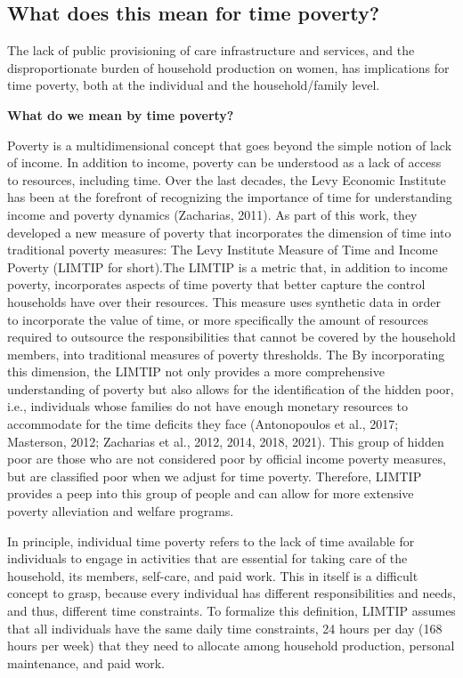 \documentclass[
  11pt,
]{article}
\begin{document}
\subsection{What does this mean for time
poverty?}\label{what-does-this-mean-for-time-poverty}

The lack of public provisioning of care infrastructure and services, and
the disproportionate burden of household production on women, has
implications for time poverty, both at the individual and the
household/family level.

\textbf{What do we mean by time poverty?}

Poverty is a multidimensional concept that goes beyond the simple notion
of lack of income. In addition to income, poverty can be understood as a
lack of access to resources, including time. Over the last decades, the
Levy Economic Institute has been at the forefront of recognizing the
importance of time for understanding income and poverty dynamics
(Zacharias, 2011). As part of this work, they developed a new measure of
poverty that incorporates the dimension of time into traditional poverty
measures: The Levy Institute Measure of Time and Income Poverty (LIMTIP
for short).The LIMTIP is a metric that, in addition to income poverty,
incorporates aspects of time poverty that better capture the control
households have over their resources. This measure uses synthetic data
in order to incorporate the value of time, or more specifically the
amount of resources required to outsource the responsibilities that
cannot be covered by the household members, into traditional measures of
poverty thresholds. The By incorporating this dimension, the LIMTIP not
only provides a more comprehensive understanding of poverty but also
allows for the identification of the hidden poor, i.e., individuals
whose families do not have enough monetary resources to accommodate for
the time deficits they face (Antonopoulos et al., 2017; Masterson, 2012;
Zacharias et al., 2012, 2014, 2018, 2021). This group of hidden poor are
those who are not considered poor by official income poverty measures,
but are classified poor when we adjust for time poverty. Therefore,
LIMTIP provides a peep into this group of people and can allow for more
extensive poverty alleviation and welfare programs.

In principle, individual time poverty refers to the lack of time
available for individuals to engage in activities that are essential for
taking care of the household, its members, self-care, and paid work.
This in itself is a difficult concept to grasp, because every individual
has different responsibilities and needs, and thus, different time
constraints. To formalize this definition, LIMTIP assumes that all
individuals have the same daily time constraints, 24 hours per day (168
hours per week) that they need to allocate among household production,
personal maintenance, and paid work.
\end{document}
